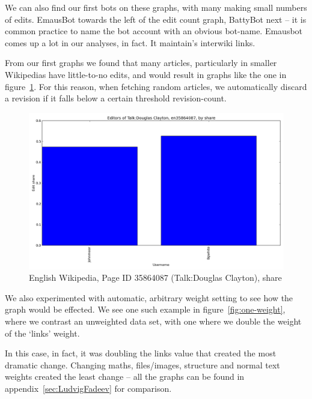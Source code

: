 We can also find our first bots on these graphs, with many making
small numbers of edits. EmausBot towards the left of the edit count
graph, BattyBot next -- it is common practice to name the bot account
with an obvious bot-name. Emausbot comes up a lot in our analyses, in
fact. It maintain's interwiki links.

From our first graphs we found that many articles, particularly in
smaller Wikipedias have little-to-no edits, and would result in graphs
like the one in figure~\ref{fig:useless-share}. For this reason, when
fetching random articles, we automatically discard a revision if it
falls below a certain threshold revision-count.

\begin{figure}
  \includegraphics[width=1\linewidth]{img/useless/Talk:DouglasClayton.png}
  \caption{English Wikipedia, Page ID 35864087 (Talk:Douglas
    Clayton), share}
  \label{fig:useless-share}
\end{figure}

We also experimented with automatic, arbitrary weight setting to see
how the graph would be effected. We see one such example in
figure~\ref{fig:one-weight}, where we contrast an unweighted data set,
with one where we double the weight of the `links' weight.

In this case, in fact, it was doubling the links value that created
the most dramatic change. Changing maths, files/images, structure and
normal text weights created the least change -- all the graphs can be
found in appendix~\ref{sec:LudvigFadeev} for comparison.

